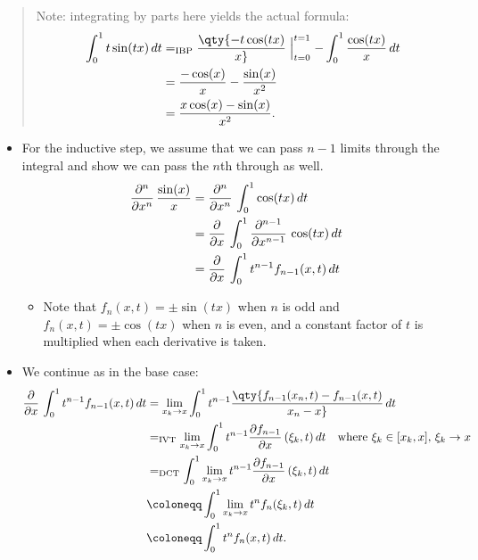 \begin{solution}
\begin{quote}
Note: integrating by parts here yields the actual formula:
\begin{align*}
\int_0^1 t\sin(tx) \,dt 
&=_{\text{IBP}} \qty{-t\cos(tx) \over x}\mathrel{\Big|}_{t=0}^{t=1} - \int_0^1 {\cos(tx) \over x} \,dt \\
&= {-\cos(x) \over x} - {\sin(x) \over x^2} \\
&= {x\cos(x) - \sin(x) \over x^2}
.\end{align*}
\end{quote}

\begin{itemize}
\tightlist
\item
  For the inductive step, we assume that we can pass \(n-1\) limits
  through the integral and show we can pass the \(n\)th through as well.
  \begin{align*}
  {\frac{\partial ^n}{\partial x^n}\,} {\sin(x) \over x} 
  &= {\frac{\partial ^n}{\partial x^n}\,} \int_0^1 \cos(tx)\,dt  \\
  &= {\frac{\partial }{\partial x}\,} \int_0^1 {\frac{\partial ^{n-1}}{\partial x^{n-1}}\,} \cos(tx)\,dt  \\
  &= {\frac{\partial }{\partial x}\,} \int_0^1 t^{n-1} f_{n-1}(x, t) \,dt 
  \end{align*}

  \begin{itemize}
  \tightlist
  \item
    Note that \(f_n(x, t) = \pm \sin(tx)\) when \(n\) is odd and
    \(f_n(x, t) = \pm \cos(tx)\) when \(n\) is even, and a constant
    factor of \(t\) is multiplied when each derivative is taken.
  \end{itemize}
\item
  We continue as in the base case:
  \begin{align*}
  {\frac{\partial }{\partial x}\,} \int_0^1 t^{n-1} f_{n-1}(x, t) \,dt 
  &= \lim_{x_k\to x} \int_0^1 t^{n-1} \qty{ f_{n-1}(x_n, t) - f_{n-1}(x, t) \over x_n - x} \,dt \\
  &=_{\text{IVT}} \lim_{x_k\to x} \int_0^1 t^{n-1} {\frac{\partial f_{n-1}}{\partial x}\,}(\xi_k, t) \,dt \quad\text{where } \xi_k\in [x_k, x],\, \xi_k \to x \\
  &=_{\text{DCT}} \int_0^1 \lim_{x_k\to x} t^{n-1} {\frac{\partial f_{n-1}}{\partial x}\,}(\xi_k, t) \,dt \\
  &\coloneqq\int_0^1 \lim_{x_k\to x} t^{n} f_n(\xi_k, t) \,dt \\
  &\coloneqq\int_0^1 t^{n} f_n(x, t) \,dt 
  .\end{align*}


\end{itemize}
\end{solution}
